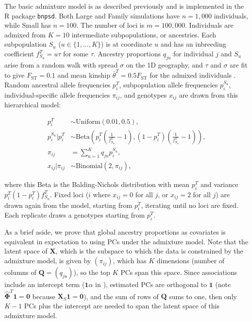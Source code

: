 \documentclass[9pt,lineno]{elife}
\newcommand{\Fst}{F_{\text{ST}}}
\newcommand{\xij}[1][j]{x_{i#1}}
\newcommand{\pit}{p_i^T}
\newcommand{\ft}[1][j]{f_{#1}^T}
\begin{document}
The basic admixture model is as described previously \citep{ochoa_estimating_2021} and is implemented in the R package \texttt{bnpsd}.
Both Large and Family simulations have $n = 1,000$ individuals, while Small has $n = 100$.
The number of loci is $m = 100,000$.
Individuals are admixed from $K = 10$ intermediate subpopulations, or ancestries.
Each subpopulation $S_u$ ($u \in \{ 1, ..., K \}$) is at coordinate $u$ and has an inbreeding coefficient $\ft[S_u] = u \tau$ for some $\tau$.
Ancestry proportions $q_{ju}$ for individual $j$ and $S_u$ arise from a random walk with spread $\sigma$ on the 1D geography, and $\tau$ and $\sigma$ are fit to give $\Fst = 0.1$ and mean kinship $\bar{\theta}^T = 0.5 \Fst$ for the admixed individuals \citep{ochoa_estimating_2021}.
Random ancestral allele frequencies $\pit$, subpopulation allele frequencies $p_i^{S_u}$, individual-specific allele frequencies $\pi_{ij}$, and genotypes $\xij$ are drawn from this hierarchical model:
\begin{linenomath*}
  \begin{align*}
    \pit
    &\sim
      \text{Uniform}( 0.01, 0.5 )
      , \\
    p_i^{S_u} | \pit
    &\sim
      \text{Beta} \left(
      \pit \left( \frac{1}{ \ft[S_u] } - 1 \right),
      \left( 1 - \pit \right) \left( \frac{1}{ \ft[S_u] } - 1 \right)
      \right)
      , \\
    \pi_{ij}
    &=
      \sum_{u = 1}^K q_{ju} p_i^{S_u}
      , \\
    \xij | \pi_{ij}
    &\sim
      \text{Binomial}(2, \pi_{ij})
      ,
  \end{align*}
\end{linenomath*}
where this Beta is the Balding-Nichols distribution \citep{balding_method_1995} with mean $\pit$ and variance $\pit \left( 1 - \pit \right) \ft[S_u]$.
Fixed loci ($i$ where $\xij = 0$ for all $j$, or $\xij = 2$ for all $j$) are drawn again from the model, starting from $\pit$, iterating until no loci are fixed.
Each replicate draws a genotypes starting from $\pit$.

As a brief aside, we prove that global ancestry proportions as covariates is equivalent in expectation to using PCs under the admixture model.
Note that the latent space of $\mathbf{X}$, which is the subspace to which the data is constrained by the admixture model, is given by $(\pi_{ij})$, which has $K$ dimensions (number of columns of $\mathbf{Q} = (q_{ju})$), so the top $K$ PCs span this space.
Since associations include an intercept term ($\mathbf{1} \alpha$ in ), estimated PCs are orthogonal to $\mathbf{1}$ (note $\mathbf{\hat{\Phi}}^T \mathbf{1} = \mathbf{0}$ because $\mathbf{X}_S \mathbf{1} = \mathbf{0}$), and the sum of rows of $\mathbf{Q}$ sums to one, then only $K-1$ PCs plus the intercept are needed to span the latent space of this admixture model.
\end{document}
